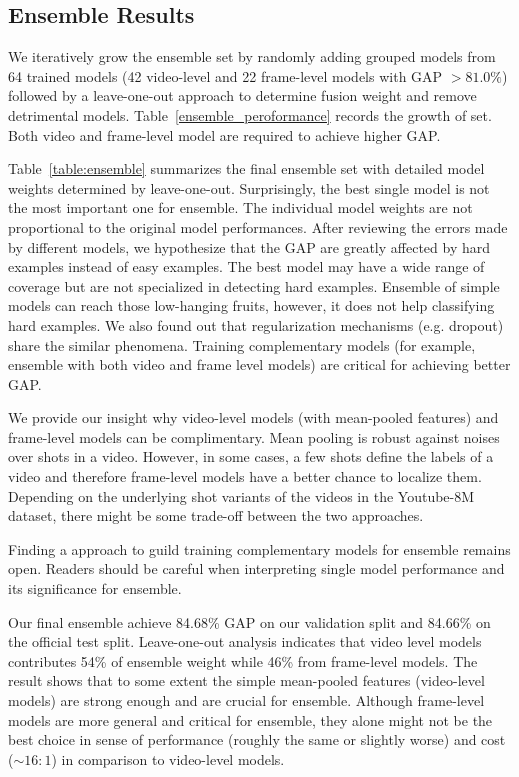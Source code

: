 \documentclass[10pt,twocolumn,letterpaper]{article}
\begin{document}
\subsection{Ensemble Results}
We iteratively grow the ensemble set by randomly adding grouped models from 64 trained models (42 video-level and 22 frame-level models with GAP $> 81.0\%$) followed by a leave-one-out approach to determine fusion weight and remove detrimental models. Table~\ref{ensemble_peroformance} records the growth of set. Both video and frame-level model are required to achieve higher GAP.

Table~\ref{table:ensemble} summarizes the final ensemble set with detailed model weights determined by leave-one-out. Surprisingly, the best single model is not the most important one for ensemble. The individual model weights are not proportional to the original model performances. After reviewing the errors made by different models, we hypothesize that the GAP are greatly affected by hard examples instead of easy examples. The best model may have a wide range of coverage but are not specialized in detecting hard examples. Ensemble of simple models can reach those low-hanging fruits, however, it does not help classifying hard examples. We also found out that regularization mechanisms (e.g. dropout) share the similar phenomena. Training complementary models (for example, ensemble with both video and frame level models) are critical for achieving better GAP. 

We provide our insight why video-level models (with mean-pooled features) and frame-level models can be complimentary. Mean pooling is robust against noises over shots in a video. However, in some cases, a few shots define the labels of a video and therefore frame-level models have a better chance to localize them. Depending on the underlying shot variants of the videos in the Youtube-8M dataset, there might be some trade-off between the two approaches.

Finding a approach to guild training complementary models for ensemble remains open. Readers should be careful when interpreting single model performance and its significance for ensemble.

Our final ensemble achieve 84.68\% GAP on our validation split and 84.66\% on the official test split. Leave-one-out analysis indicates that video level models contributes 54\% of ensemble weight while 46\% from frame-level models. The result shows that to some extent the simple mean-pooled features (video-level models) are strong enough and are crucial for ensemble. Although frame-level models are more general and critical for ensemble, they alone might not be the best choice in sense of performance (roughly the same or slightly worse) and cost ($\sim16:1$) in comparison to video-level models.
\end{document}
